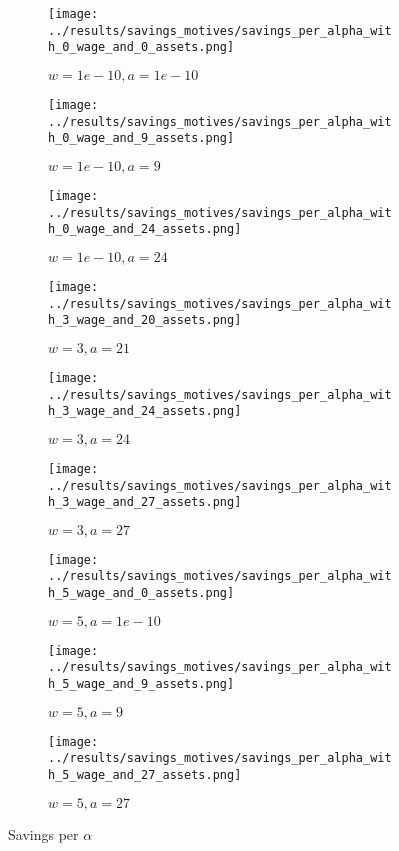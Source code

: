 \documentclass[12pt]{article}
\begin{document}
\begin{figure}[hbt!]

\begin{subfigure}{0.33\textwidth}
\texttt{[image: ../results/savings\_motives/savings\_per\_alpha\_with\_0\_wage\_and\_0\_assets.png]} \caption{$w=1e-10, a=1e-10$}
\end{subfigure}%
\begin{subfigure}{0.33\textwidth}
\texttt{[image: ../results/savings\_motives/savings\_per\_alpha\_with\_0\_wage\_and\_9\_assets.png]}
\caption{$w=1e-10, a=9$}
\end{subfigure}%
\begin{subfigure}{0.33\textwidth}
\texttt{[image: ../results/savings\_motives/savings\_per\_alpha\_with\_0\_wage\_and\_24\_assets.png]}
\caption{$w=1e-10, a=24$}
\end{subfigure}

\begin{subfigure}{0.33\textwidth}
\texttt{[image: ../results/savings\_motives/savings\_per\_alpha\_with\_3\_wage\_and\_20\_assets.png]} \caption{$w=3, a=21$}
\end{subfigure}%
\begin{subfigure}{0.33\textwidth}
\texttt{[image: ../results/savings\_motives/savings\_per\_alpha\_with\_3\_wage\_and\_24\_assets.png]}
\caption{$w=3, a=24$}
\end{subfigure}%
\begin{subfigure}{0.33\textwidth}
\texttt{[image: ../results/savings\_motives/savings\_per\_alpha\_with\_3\_wage\_and\_27\_assets.png]}
\caption{$w=3, a=27$}
\end{subfigure}

\begin{subfigure}{0.33\textwidth}
\texttt{[image: ../results/savings\_motives/savings\_per\_alpha\_with\_5\_wage\_and\_0\_assets.png]} \caption{$w=5, a=1e-10$}
\end{subfigure}%
\begin{subfigure}{0.33\textwidth}
\texttt{[image: ../results/savings\_motives/savings\_per\_alpha\_with\_5\_wage\_and\_9\_assets.png]}
\caption{$w=5, a=9$}
\end{subfigure}%
\begin{subfigure}{0.33\textwidth}
\texttt{[image: ../results/savings\_motives/savings\_per\_alpha\_with\_5\_wage\_and\_27\_assets.png]}
\caption{$w=5, a=27$}
\end{subfigure}

\caption{Savings per $\alpha$}
\label{fig:savings_per_alpha}
\end{figure}
\end{document}
